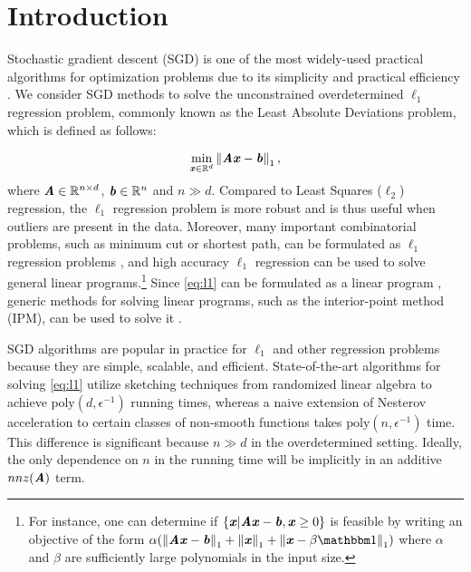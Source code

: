 \section{Introduction}\label{sec:intro}




Stochastic gradient descent (SGD) is one of the most widely-used practical algorithms for optimization problems due to its simplicity and practical efficiency
\citep{NesterovV08, NemirovskiJLS09}. We consider SGD methods to solve the unconstrained overdetermined $\ell_1$ regression problem,
commonly known as the Least Absolute Deviations problem,
which is defined as follows:

\begin{align}
\min_{\xx \in \mathbb{R}^d}  \norm{\AA \xx - \bb}_1,\label{eq:l1}
\end{align}
where $\AA \in \mathbb{R}^{n \times d}$, $\bb \in \mathbb{R}^{n}$ and $n \gg d$. Compared to Least Squares ($\ell_2$) regression, the $\ell_1$ regression problem is more robust and is thus useful when outliers are present in the data. Moreover, many important combinatorial problems, such as minimum cut or shortest path,
can be formulated as $\ell_1$ regression problems \citep{CMMP13}, and high accuracy $\ell_1$ regression can be used to solve general linear programs.\footnote{For instance, one can determine if $\{\xx|\AA \xx - \bb, \xx \ge 0\}$ is feasible by writing an objective of the form $\alpha(\norm{\AA \xx - \bb}_1 + \norm{\xx}_1 + \norm{\xx - \beta \ones}_1)$ where $\alpha$ and $\beta$ are sufficiently large polynomials in the input size.} Since \cref{eq:l1} can be formulated as a linear program \citep{PortnoyK97, ChenDS01}, generic methods for solving linear programs, such as the interior-point method (IPM), can be used to solve it \citep{PortnoyK97, Portnoy97, MengM13mapreduce, LeeS15}.

SGD algorithms are popular in practice for $\ell_1$ and other regression problems because they are simple, scalable, and efficient. State-of-the-art algorithms for solving \cref{eq:l1} utilize sketching techniques from randomized linear algebra to achieve $\text{poly}(d,\epsilon^{-1})$ running times, whereas a naive extension of Nesterov acceleration \citep{Nesterov83} to certain classes of non-smooth functions \citep{Nesterov05smooth, Nesterov05gap, Nesterov07, AllenZhuH16} takes $\text{poly}(n,\epsilon^{-1})$ time. This difference is significant because $n \gg d$ in the overdetermined setting. Ideally, the only dependence on $n$ in the running time will be implicitly in an additive $nnz(\AA)$ term.  

